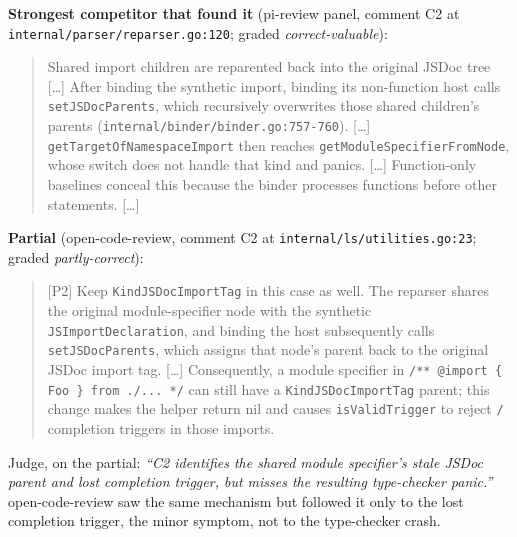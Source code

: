 \documentclass[11pt,a4paper]{article}
\newcommand{\code}[1]{\texttt{#1}}
\begin{document}
\noindent\textbf{Strongest competitor that found it} (pi-review panel, comment C2 at \code{internal/\allowbreak{}parser/\allowbreak{}reparser.go:120}; graded \emph{correct-valuable}):
\begin{quote}\small
Shared import children are reparented back into the original JSDoc tree [\ldots] After binding the synthetic import, binding its non-function host calls \texttt{setJSDocParents}, which recursively overwrites those shared children's parents (\texttt{internal/binder/binder.go:757-760}). [\ldots] \texttt{getTargetOfNamespaceImport} then reaches \texttt{getModuleSpecifierFromNode}, whose switch does not handle that kind and panics. [\ldots] Function-only baselines conceal this because the binder processes functions before other statements. [\ldots]
\end{quote}
\noindent\textbf{Partial} (open-code-review, comment C2 at \code{internal/\allowbreak{}ls/\allowbreak{}utilities.go:23}; graded \emph{partly-correct}):
\begin{quote}\small
[P2] Keep \texttt{KindJSDocImportTag} in this case as well. The reparser shares the original module-specifier node with the synthetic \texttt{JSImportDeclaration}, and binding the host subsequently calls \texttt{setJSDocParents}, which assigns that node's parent back to the original JSDoc import tag. [\ldots] Consequently, a module specifier in \texttt{/** @import \{ Foo \} from \textquotedbl{}./...\textquotedbl{} */} can still have a \texttt{KindJSDocImportTag} parent; this change makes the helper return nil and causes \texttt{isValidTrigger} to reject \texttt{/} completion triggers in those imports.
\end{quote}
\noindent Judge, on the partial: \emph{``C2 identifies the shared module specifier's stale JSDoc parent and lost completion trigger, but misses the resulting type-checker panic.''}
open-code-review saw the same mechanism but followed it only to the lost completion trigger, the minor symptom, not to the type-checker crash.
\end{document}
